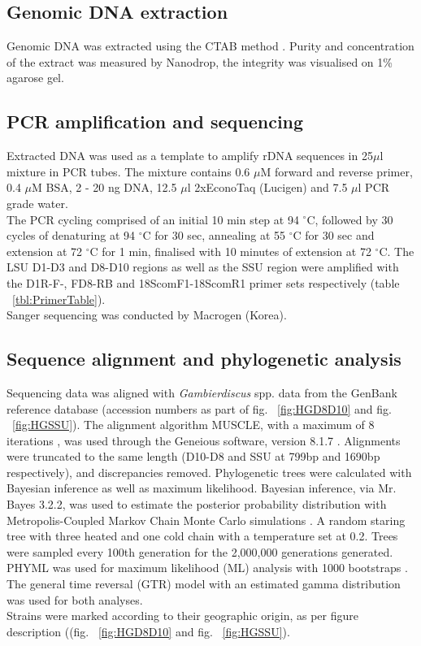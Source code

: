 \documentclass[12pt]{article}
\begin{document}
\subsection{Genomic DNA extraction}
Genomic DNA was extracted using the CTAB method \citep{zhou1999analysis}. Purity and concentration of the extract was measured by Nanodrop, the integrity was visualised on 1\% agarose gel.

\subsection{PCR amplification and sequencing}
Extracted DNA was used as a template to amplify rDNA sequences in 25$\mu$l mixture in PCR tubes. The mixture contains 0.6 $\mu$M forward and reverse primer, 0.4 $\mu$M BSA, 2 - 20 ng DNA, 12.5 $\mu$l 2xEconoTaq (Lucigen) and 7.5 $\mu$l PCR grade water.\\
The PCR cycling comprised of an initial 10 min step at 94 $^{\circ}$C, followed by 30 cycles of denaturing at 94 $^{\circ}$C for 30 sec, annealing at 55 $^{\circ}$C for 30 sec and extension at 72 $^{\circ}$C for 1 min, finalised with 10 minutes of extension at 72 $^{\circ}$C.
The LSU D1-D3  and D8-D10 regions as well as the SSU region were amplified with the D1R-F-, FD8-RB and 18ScomF1-18ScomR1 primer sets respectively (table ~\ref{tbl:PrimerTable}).\\
Sanger sequencing was conducted by Macrogen (Korea).


\subsection{Sequence alignment and phylogenetic analysis}
Sequencing data was aligned with \emph{Gambierdiscus} spp. data from the GenBank reference database (accession numbers as part of fig. ~\ref{fig:HGD8D10} and fig. ~\ref{fig:HGSSU}). The alignment algorithm MUSCLE, with a maximum of 8 iterations \citep{edgar2004muscle}, was used through the Geneious software, version 8.1.7 \citep{kearse2012geneious}. Alignments were truncated to the same length (D10-D8 and SSU at 799bp and 1690bp respectively), and discrepancies removed.
Phylogenetic trees were calculated with Bayesian inference as well as maximum likelihood. Bayesian inference, via Mr. Bayes 3.2.2, was used to estimate the posterior probability distribution with Metropolis-Coupled Markov Chain Monte Carlo simulations \citep{ronquist2003mrbayes}. A random staring tree with three heated and one cold chain with a temperature set at 0.2. Trees were sampled every 100th generation for the 2,000,000 generations generated.
PHYML was used for maximum likelihood (ML) analysis with 1000 bootstraps \citep{guindon2003simple}.
The general time reversal (GTR) model with an estimated gamma distribution was used for both analyses.\\
Strains were marked according to their geographic origin, as per figure description ((fig. ~\ref{fig:HGD8D10} and fig. ~\ref{fig:HGSSU}).
\end{document}
